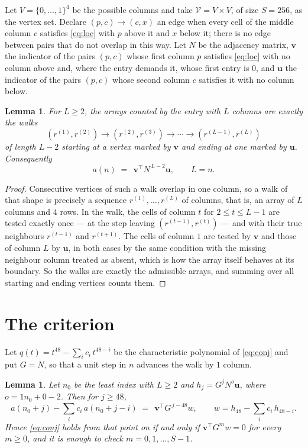 \documentclass[11pt,a4paper]{article}
\theoremstyle{plain}
\newtheorem{lemma}[theorem]{Lemma}
\theoremstyle{definition}
\begin{document}
Let $V=\{0,\dots,1\}^{4}$ be the possible columns and take
$\mathcal V=V\times V$, of size $S=256$, as the vertex set. Declare $(p,c)\to(c,x)$ an edge
when every cell of the middle column $c$ satisfies \eqref{eq:loc} with $p$ above it and $x$
below it; there is no edge between pairs that do not overlap in this way. Let $N$ be the
adjacency matrix, $\mathbf{v}$ the indicator of the pairs $(p,c)$ whose first column $p$
satisfies \eqref{eq:loc} with no column above and, where the entry demands it, whose first entry is $0$, and $\mathbf{u}$ the indicator of
the pairs $(p,c)$ whose second column $c$ satisfies it with no column below.

\begin{lemma}\label{lem:walk}
For $L\ge2$, the arrays counted by the entry with $L$ columns are exactly the walks
\[
(r^{(1)},r^{(2)})\to(r^{(2)},r^{(3)})\to\cdots\to(r^{(L-1)},r^{(L)})
\]
of length $L-2$ starting at a vertex marked by $\mathbf{v}$ and ending at one marked by
$\mathbf{u}$. Consequently
\[
a(n)\;=\;\,\mathbf{v}^{\!\top}N^{\,L-2}\mathbf{u},\qquad L=n .
\]
\end{lemma}

\begin{proof}
Consecutive vertices of such a walk overlap in one column, so a walk of that shape is
precisely a sequence $r^{(1)},\dots,r^{(L)}$ of columns, that is, an array of $L$ columns
and $4$ rows. In the walk, the cells of column $t$ for $2\le t\le L-1$ are tested
exactly once --- at the step leaving $(r^{(t-1)},r^{(t)})$ --- and with their true
neighbours $r^{(t-1)}$ and $r^{(t+1)}$. The cells of column $1$ are tested by
$\mathbf{v}$ and those of column $L$ by $\mathbf{u}$, in both cases by the same condition
with the missing neighbour column treated as absent, which is how the array itself behaves at
its boundary. So the walks are exactly the admissible arrays, and summing over all starting
and ending vertices counts them.
\end{proof}

\section{The criterion}

Let $q(t)=t^{48}-\sum_i c_i\,t^{48-i}$ be the characteristic polynomial of
\eqref{eq:conj} and put $G=N$, so that a unit step in $n$ advances the walk by
$1$ column.

\begin{lemma}\label{lem:crit}
Let $n_0$ be the least index with $L\ge2$ and $h_j=G^{j}N^{o}\mathbf{u}$, where
$o=1n_0+0-2$. Then for $j\ge48$,
\[
a(n_0+j)-\sum_i c_i\,a(n_0+j-i)\;=\;\,\mathbf{v}^{\!\top}G^{\,j-48}w,
\qquad w=h_{48}-\sum_i c_i\,h_{48-i} .
\]
Hence \eqref{eq:conj} holds from that point on if and only if
$\mathbf{v}^{\!\top}G^{m}w=0$ for every $m\ge0$, and it is enough to check
$m=0,1,\dots,S-1$.
\end{lemma}
\end{document}
